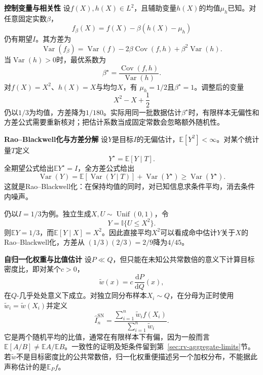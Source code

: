 \par\medskip\noindent\textbf{控制变量与相关性}\quad
设\(f(X),h(X)\in L^2\)，且辅助变量\(h(X)\)的均值\(\mu_h\)已知。对任意固定实数\(\beta\)，
\[ f_\beta(X)
  =f(X)-\beta(h(X)-\mu_h) \]
仍有期望\(I\)。其方差为
\[ \operatorname{Var}(f_\beta)
  =\operatorname{Var}(f)-2\beta\operatorname{Cov}(f,h)+\beta^2\operatorname{Var}(h). \]
当\(\operatorname{Var}(h)>0\)时，最优系数为
\[ \beta^\star
  =\frac{\operatorname{Cov}(f,h)}{\operatorname{Var}(h)}. \]
对\(f(X)=X^2\)、\(h(X)=X\)与均匀\(X\)，有
\(\mu_h=1/2\)且\(\beta^\star=1\)。调整后的变量
\[ X^2-X+\frac12 \]
仍以\(1/3\)为均值，方差降为\(1/180\)。实际用同一批数据估计\(\beta^\star\)时，有限样本无偏性和方差公式需要重新核对；把估计系数当成固定常数会忽略额外随机性。

\par\medskip\noindent\textbf{Rao--Blackwell化与方差分解}\quad
设\(Y\)是目标\(I\)的无偏估计，\(\mathbb{E}[Y^2]<\infty\)。对某个统计量\(T\)定义
\[ Y^\star=\mathbb{E}[Y\mid T]. \]
全期望公式给出\(\mathbb{E}Y^\star=I\)，全方差公式给出
\begin{equation}
  \operatorname{Var}(Y)
  =
  \mathbb{E}[\operatorname{Var}(Y\mid T)]
  +
  \operatorname{Var}(Y^\star)
  \geq
  \operatorname{Var}(Y^\star).
  \label{eq:probability-rao-blackwell-variance}
\end{equation}
这就是Rao--Blackwell化：在保持均值的同时，对已知信息求条件平均，消去条件内噪声。

仍以\(I=1/3\)为例。独立生成\(X,U\sim\operatorname{Unif}(0,1)\)，令
\[ Y=\mathbb{I}\{U\leq X^2\}. \]
则\(\mathbb{E}Y=1/3\)，而\(\mathbb{E}[Y\mid X]=X^2\)。因此直接平均\(X^2\)可以看成命中估计\(Y\)关于\(X\)的Rao--Blackwell化，方差从
\((1/3)(2/3)=2/9\)降为\(4/45\)。

\par\medskip\noindent\textbf{自归一化权重与比值估计}\quad
设\(P\ll Q\)，但只能在未知公共常数倍的意义下计算目标密度比，即对某个\(c>0\)，
\[
  \widetilde{w}(x)
  =
  c\,\frac{\mathrm{d}P}{\mathrm{d}Q}(x),
\]
在\(Q\)-几乎处处意义下成立。对独立同分布样本\(X_i\sim Q\)，在分母为正时使用
\(\widetilde{w}_i=\widetilde{w}(X_i)\)并定义
\begin{equation}
  \widehat{I}^{\mathrm{SN}}_n
  =
  \frac{\sum_{i=1}^{n}\widetilde{w}_if(X_i)}
       {\sum_{i=1}^{n}\widetilde{w}_i}.
  \label{eq:probability-self-normalized-importance-sampling}
\end{equation}
它是两个随机平均的比值，通常在有限样本下有偏，因为一般而言
\(\mathbb E[A/B]\ne\mathbb EA/\mathbb EB\)。一致性的证明及矩条件留到第~\ref{sec:rv-aggregate-limits}节。
若\(\widetilde w\)不是目标密度比的公共常数倍，归一化权重便描述另一个加权分布，不能据此声称估计的是\(\mathbb E_Pf\)。

